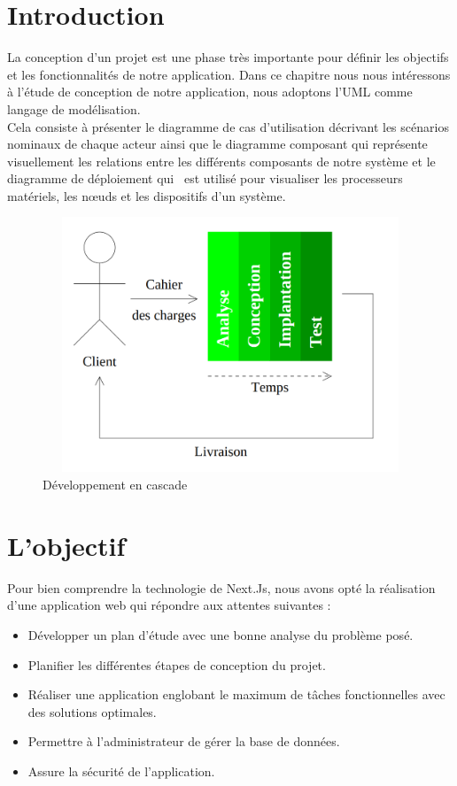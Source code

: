 \documentclass[12pt]{report}
\begin{document}
\newpage

\section{Introduction}
\hspace*{0.16in}
La conception d’un projet est une phase très importante pour définir les objectifs et les fonctionnalités de notre application. Dans ce chapitre nous nous intéressons à l’étude de conception de notre application, nous adoptons l’UML comme langage de modélisation.
\\
\hspace*{0.16in}
Cela consiste à présenter le diagramme de cas d’utilisation décrivant les scénarios nominaux de chaque acteur ainsi que le diagramme composant qui représente visuellement les relations entre les différents composants de notre système et le diagramme de déploiement qui  est utilisé pour visualiser les processeurs matériels, les nœuds et les dispositifs d’un système.

\vspace{0.1in}

\begin{figure}[h]
\centering
    \includegraphics[width = 5in, height = 3in]{../images/analyse_conception.png}
\caption{Développement en cascade}
\end{figure}

\section{L'objectif}
\hspace*{0.16in}
Pour bien comprendre la technologie de Next.Js, nous avons opté la réalisation d’une application web qui répondre aux attentes suivantes :

\begin{itemize}
    \item Développer un plan d’étude avec une bonne analyse du problème posé.
    \item Planifier les différentes étapes de conception du projet.
    \item Réaliser une application englobant le maximum de tâches fonctionnelles avec des solutions optimales.
    \item Permettre à l’administrateur de gérer la base de données.
    \item Assure la sécurité de l'application.
\end{itemize}
\end{document}

